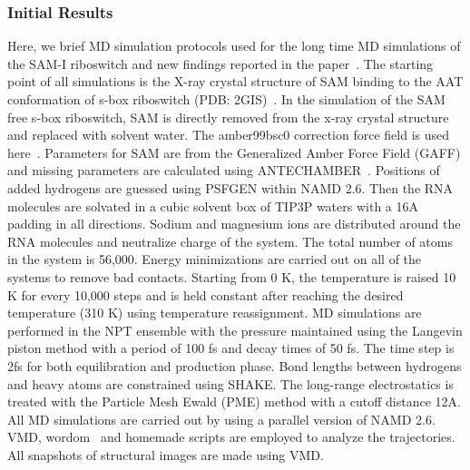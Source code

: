 \documentclass[a4paper,10pt]{article}
\begin{document}
\subsubsection*{Initial Results}

Here, we brief MD simulation protocols used for the long time MD simulations of the SAM-I riboswitch and new findings reported in the paper~\cite{SAM-I-NAR2009}.  The starting point of all simulations is the X-ray crystal structure of SAM binding to the AAT conformation of s-box riboswitch (PDB: 2GIS)~\cite{montange}. In the simulation of the SAM free s-box riboswitch, SAM is directly removed from the x-ray crystal structure and replaced with solvent water. The amber99bsc0 correction force field is used here~\cite{alberto}. Parameters for SAM are from the Generalized Amber Force Field (GAFF) and missing parameters are calculated using ANTECHAMBER~\cite{wang}. Positions of added hydrogens are guessed using PSFGEN within NAMD 2.6. Then the RNA molecules are solvated in a cubic solvent box of TIP3P waters with a 16A padding in all directions. Sodium and magnesium ions are distributed around the RNA molecules and neutralize charge of the system. The total number of atoms in the system is 56,000. Energy minimizations are carried out on all of the systems to remove bad contacts. Starting from 0 K, the temperature is raised 10 K for every 10,000 steps and is held constant after reaching the desired temperature (310 K) using temperature reassignment. MD simulations are performed in the NPT ensemble with the pressure maintained using the Langevin piston method with a period of 100 fs and decay times of 50 fs. The time step is 2fs for both equilibration and production phase. Bond lengths between hydrogens and heavy atoms are constrained using SHAKE. The long-range electrostatics is treated with the Particle Mesh Ewald (PME) method with a cutoff distance 12A.  All MD simulations are carried out by using a parallel version of NAMD 2.6.  VMD, wordom~\cite{moe} and homemade scripts are employed to analyze the trajectories. All snapshots of structural images are made using VMD.

\end{document}
